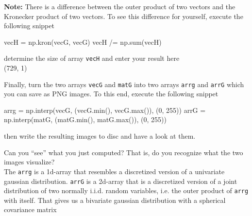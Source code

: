 \newpage
\textbf{Note:} There is a difference between the outer product of two vectors and the Kronecker product of two vectors. To see this difference for yourself, execute the following snippet
\begin{python}
vecH  = np.kron(vecG, vecG)
vecH /= np.sum(vecH)
\end{python}
determine the size of array \texttt{vecH} and enter your result here
\color{blue} \\[1ex]
(729, 1)
\color{black}



\vspace{1cm}
Finally, turn the two arrays \texttt{vecG} and \texttt{matG} into two arrays \texttt{arrg} and \texttt{arrG} which you can save as PNG images. To this end, execute the following snippet 
\begin{python}
arrg = np.interp(vecG, (vecG.min(), vecG.max()), (0, 255))
arrG = np.interp(matG, (matG.min(), matG.max()), (0, 255))
\end{python}
then write the resulting images to disc and have a look at them.

Can you ``see'' what you just computed? That is, do you recognize what the two images visualize?
\color{blue} \\[1ex]
The \texttt{arrg} is a 1d-array that resembles a discretized version of a univariate gaussian distribution.
 \texttt{arrG} is a 2d-array that is a discretized version of a joint distribution of two normally i.i.d. random variables, i.e. the outer product of  \texttt{arrg} with itself. That gives us a bivariate gaussian distribution with a spherical covariance matrix
\color{black}